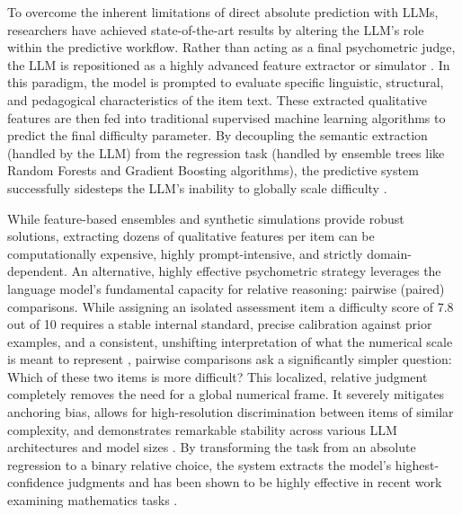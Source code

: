 \documentclass[11pt]{article}
\begin{document}
To overcome the inherent limitations of direct absolute prediction with LLMs, researchers have achieved state-of-the-art results by altering the LLM's role within the predictive workflow. Rather than acting as a final psychometric judge, the LLM is repositioned as a highly advanced feature extractor or simulator \citep{hoylSyntheticStudentResponses2026, kolesnikovaEstimatingItemDifficulty2026, scarlatosSMARTSimulatedStudents2025}. In this paradigm, the model is prompted to evaluate specific linguistic, structural, and pedagogical characteristics of the item text. These extracted qualitative features are then fed into traditional supervised machine learning algorithms to predict the final difficulty parameter. By decoupling the semantic extraction (handled by the LLM) from the regression task (handled by ensemble trees like Random Forests and Gradient Boosting algorithms), the predictive system successfully sidesteps the LLM's inability to globally scale difficulty \citep{feliceBritishCouncilSubmission}.

While feature-based ensembles and synthetic simulations provide robust solutions, extracting dozens of qualitative features per item can be computationally expensive, highly prompt-intensive, and strictly domain-dependent. An alternative, highly effective psychometric strategy leverages the language model's fundamental capacity for relative reasoning: pairwise (paired) comparisons. While assigning an isolated assessment item a difficulty score of 7.8 out of 10 requires a stable internal standard, precise calibration against prior examples, and a consistent, unshifting interpretation of what the numerical scale is meant to represent \citep{digiuseppeScalingOpenEndedSurvey2026}, pairwise comparisons ask a significantly simpler question: Which of these two items is more difficult? This localized, relative judgment completely removes the need for a global numerical frame. It severely mitigates anchoring bias, allows for high-resolution discrimination between items of similar complexity, and demonstrates remarkable stability across various LLM architectures and model sizes \citep{digiuseppeScalingOpenEndedSurvey2026}. By transforming the task from an absolute regression to a binary relative choice, the system extracts the model's highest-confidence judgments and has been shown to be highly effective in recent work examining mathematics tasks \citep{kolesnikovaEstimatingItemDifficulty2026}.
\end{document}
